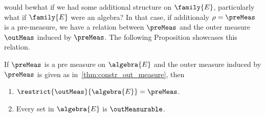 would be{\textemdash}what if we had some additional structure on $\family{E}$, particularly what if 
$\family{E}$
were an algebra? In that case, if additionaly $\rho = \preMeas$ is a pre-measure, we have a relation
between $\preMeas$ and the outer measure $\outMeas$ induced by $\preMeas$. The following Proposition
showcases this relation.
\begin{Proposition}\label{prop:out_meas_iduced_pre_measure}
    If $\preMeas$ is a pre measure on $\algebra{E}$ and the outer measure induced by $\preMeas$ is
    given as in~\ref{thm:constr_out_measure}, then
    \begin{enumerate}
	\item
	    $\restrict{\outMeas}{\algebra{E}} = \preMeas$.
	\item
	    Every set in $\algebra{E}$ is $\outMeasurable$.
    \end{enumerate}
\end{Proposition}
